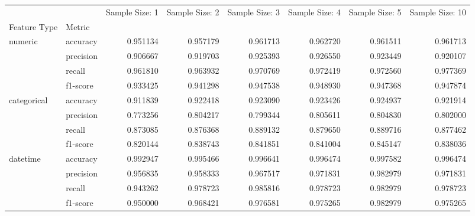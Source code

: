 \begin{tabular}{llrrrrrr}
\toprule
                 &          &  Sample Size: 1 &  Sample Size: 2 &  Sample Size: 3 &  Sample Size: 4 &  Sample Size: 5 &  Sample Size: 10 \\
Feature Type & Metric &                  &                  &                  &                  &                  &                   \\
\midrule
numeric & accuracy &         0.951134 &         0.957179 &         0.961713 &         0.962720 &         0.961511 &          0.961713 \\
                 & precision &         0.906667 &         0.919703 &         0.925393 &         0.926550 &         0.923449 &          0.920107 \\
                 & recall &         0.961810 &         0.963932 &         0.970769 &         0.972419 &         0.972560 &          0.977369 \\
                 & f1-score &         0.933425 &         0.941298 &         0.947538 &         0.948930 &         0.947368 &          0.947874 \\
categorical & accuracy &         0.911839 &         0.922418 &         0.923090 &         0.923426 &         0.924937 &          0.921914 \\
                 & precision &         0.773256 &         0.804217 &         0.799344 &         0.805611 &         0.804830 &          0.802000 \\
                 & recall &         0.873085 &         0.876368 &         0.889132 &         0.879650 &         0.889716 &          0.877462 \\
                 & f1-score &         0.820144 &         0.838743 &         0.841851 &         0.841004 &         0.845147 &          0.838036 \\
datetime & accuracy &         0.992947 &         0.995466 &         0.996641 &         0.996474 &         0.997582 &          0.996474 \\
                 & precision &         0.956835 &         0.958333 &         0.967517 &         0.971831 &         0.982979 &          0.971831 \\
                 & recall &         0.943262 &         0.978723 &         0.985816 &         0.978723 &         0.982979 &          0.978723 \\
                 & f1-score &         0.950000 &         0.968421 &         0.976581 &         0.975265 &         0.982979 &          0.975265 \\

\end{tabular}
